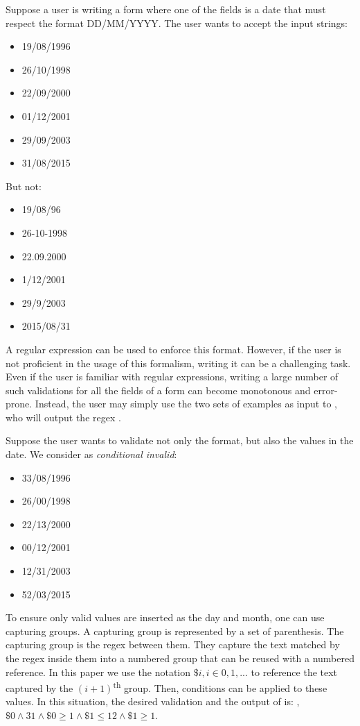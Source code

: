 Suppose a user is writing a form where one of the fields is a date that must respect the format DD/MM/YYYY.
The user wants to accept the input strings:
\begin{multicols}{3}
    \begin{itemize}[label={},noitemsep]
    \item 19/08/1996
    \item 26/10/1998
    \item 22/09/2000
    \item 01/12/2001
    \item 29/09/2003
    \item 31/08/2015
    \end{itemize}
\end{multicols}
\noindent
But not:
\begin{multicols}{3}
\begin{itemize}[label={},noitemsep]
\item 19/08/96
\item 26-10-1998
\item 22.09.2000
\item 1/12/2001
\item 29/9/2003
\item 2015/08/31
\end{itemize}
\end{multicols}
\noindent
A regular expression can be used to enforce this format. However, if the user is not proficient in the usage of this formalism, writing it can be a challenging task. Even if the user is familiar with regular expressions, writing a large number of such validations for all the fields of a form can become monotonous and error-prone.
Instead, the user may simply use the two sets of examples as input to \Forest{}, who will output the regex .

Suppose the user wants to validate not only the format, but also the values in the date.
We consider as \textit{conditional invalid}:
\begin{multicols}{3}
    \begin{itemize}[label={},noitemsep]
    \item 33/08/1996
    \item 26/00/1998
    \item 22/13/2000
    \item 00/12/2001
    \item 12/31/2003
    \item 52/03/2015
    \end{itemize}
\end{multicols}
To ensure only valid values are inserted as the day and month, one can use capturing groups. A capturing group is represented by a set of parenthesis. The capturing group is the regex between them. They capture the text matched by the regex inside them into a numbered group that can be reused with a numbered reference. In this paper we use the notation \(\$i, i \in 0, 1, ...\) to reference the text captured by the \((i+1)\)\textsuperscript{th} group.
Then, conditions can be applied to these values. In this situation, the desired validation and the output of \Forest is:
, \(\$0 \wedge 31 \wedge \$0 \ge 1 \wedge \$1 \le 12 \wedge \$1 \ge 1\).

